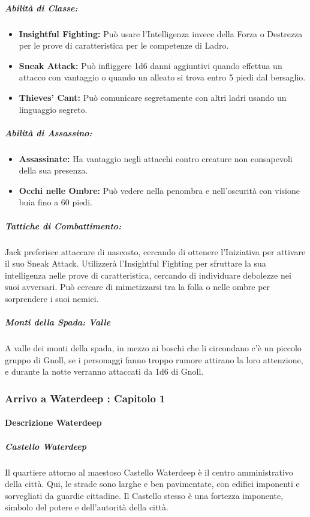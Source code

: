 \documentclass{article}
\begin{document}
\subparagraph*{Abilità di Classe:}
\begin{itemize}
  \item \textbf{Insightful Fighting:} Può usare l'Intelligenza invece della Forza o Destrezza per le prove di caratteristica per le competenze di Ladro.
  \item \textbf{Sneak Attack:} Può infliggere 1d6 danni aggiuntivi quando effettua un attacco con vantaggio o quando un alleato si trova entro 5 piedi dal bersaglio.
  \item \textbf{Thieves' Cant:} Può comunicare segretamente con altri ladri usando un linguaggio segreto.
\end{itemize}

\subparagraph*{Abilità di Assassino:}
\begin{itemize}
  \item \textbf{Assassinate:} Ha vantaggio negli attacchi contro creature non consapevoli della sua presenza.
  \item \textbf{Occhi nelle Ombre:} Può vedere nella penombra e nell'oscurità con visione buia fino a 60 piedi.
\end{itemize}

\subparagraph*{Tattiche di Combattimento:}
Jack preferisce attaccare di nascosto, cercando di ottenere l'Iniziativa per attivare il suo Sneak Attack. Utilizzerà l'Insightful Fighting per sfruttare la sua intelligenza nelle prove di caratteristica, cercando di individuare debolezze nei suoi avversari. Può cercare di mimetizzarsi tra la folla o nelle ombre per sorprendere i suoi nemici.

\subparagraph{Monti della Spada: Valle}
A valle dei monti della spada, in mezzo ai boschi che li circondano c'è un piccolo gruppo di Gnoll, se i personaggi fanno troppo rumore attirano la loro attenzione, e durante la notte verranno attaccati da 1d6 di Gnoll. 

\subsubsection{Arrivo a Waterdeep : Capitolo 1}
\paragraph{Descrizione Waterdeep}
\subparagraph{Castello Waterdeep}
Il quartiere attorno al maestoso Castello Waterdeep è il centro amministrativo della città. Qui, le strade sono larghe e ben pavimentate, con edifici imponenti e sorvegliati da guardie cittadine. Il Castello stesso è una fortezza imponente, simbolo del potere e dell'autorità della città.
\end{document}
